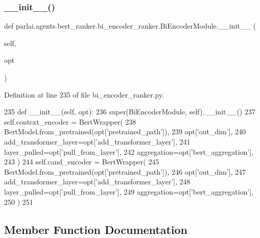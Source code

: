 \subsubsection{\texorpdfstring{\+\_\+\+\_\+init\+\_\+\+\_\+()}{\_\_init\_\_()}}
{\footnotesize\ttfamily def parlai.\+agents.\+bert\+\_\+ranker.\+bi\+\_\+encoder\+\_\+ranker.\+Bi\+Encoder\+Module.\+\_\+\+\_\+init\+\_\+\+\_\+ (\begin{DoxyParamCaption}\item[{}]{self,  }\item[{}]{opt }\end{DoxyParamCaption})}



Definition at line 235 of file bi\+\_\+encoder\+\_\+ranker.\+py.


\begin{DoxyCode}
235     \textcolor{keyword}{def }\_\_init\_\_(self, opt):
236         super(BiEncoderModule, self).\_\_init\_\_()
237         self.context\_encoder = BertWrapper(
238             BertModel.from\_pretrained(opt[\textcolor{stringliteral}{'pretrained\_path'}]),
239             opt[\textcolor{stringliteral}{'out\_dim'}],
240             add\_transformer\_layer=opt[\textcolor{stringliteral}{'add\_transformer\_layer'}],
241             layer\_pulled=opt[\textcolor{stringliteral}{'pull\_from\_layer'}],
242             aggregation=opt[\textcolor{stringliteral}{'bert\_aggregation'}],
243         )
244         self.cand\_encoder = BertWrapper(
245             BertModel.from\_pretrained(opt[\textcolor{stringliteral}{'pretrained\_path'}]),
246             opt[\textcolor{stringliteral}{'out\_dim'}],
247             add\_transformer\_layer=opt[\textcolor{stringliteral}{'add\_transformer\_layer'}],
248             layer\_pulled=opt[\textcolor{stringliteral}{'pull\_from\_layer'}],
249             aggregation=opt[\textcolor{stringliteral}{'bert\_aggregation'}],
250         )
251 
\end{DoxyCode}


\subsection{Member Function Documentation}
\mbox{\label{classparlai_1_1agents_1_1bert__ranker_1_1bi__encoder__ranker_1_1BiEncoderModule_a74b6c842e6e99d8a86f669e385ae48e9}} 
